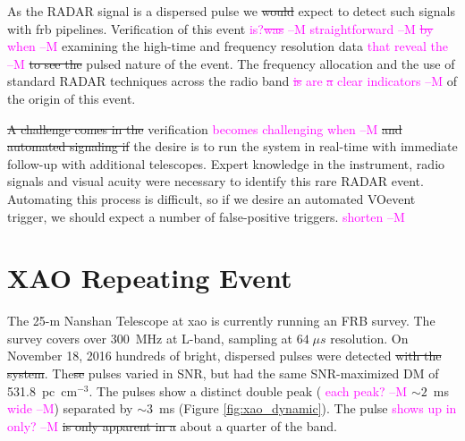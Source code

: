 \documentclass[a4paper,fleqn,usenatbib]{mnras}
\newcommand{\cM}[1]{\textcolor{magenta}{ #1 --M}}
\begin{document}
As the RADAR signal is a dispersed pulse we \sout{would} expect to detect such signals
with \gls{frb} pipelines.  Verification of this event \cM{is?\sout{was}} \cM{straightforward} \cM{\sout{by} when}
examining the high-time and frequency resolution data \cM{that reveal the} \sout{to see the} pulsed nature
of the event.  The frequency allocation and the use of standard RADAR techniques
across the radio band \cM{\sout{is} are \sout{a} clear indicators} of the origin of this event.  

\sout{A
challenge comes in the} verification \cM{becomes challenging when} \sout{and automated signaling if} the desire is to
run the system in real-time with immediate follow-up with additional telescopes.
Expert knowledge in the instrument, radio signals and visual acuity were
necessary to identify this rare RADAR event.  Automating this process is
difficult, so if we desire an automated VOevent trigger, we should expect a
number of false-positive triggers. \cM{shorten}

\section{XAO Repeating Event}
\label{sec:xao_event}

The 25-m Nanshan Telescope at \gls{xao} is currently running an FRB survey. The
survey covers over 300~MHz at L-band, sampling at $64 \; \mu s$ resolution. On
November 18, 2016 hundreds of bright, dispersed pulses were detected \sout{with the
system}. The\sout{se} pulses varied in SNR, but had the same SNR-maximized DM of
531.8~pc~cm$^{-3}$. The pulses show a distinct double peak (\cM{each peak?} $\sim 2$~ms \cM{wide})
separated by $\sim 3$~ms (Figure \ref{fig:xao_dynamic}). The pulse \cM{shows up in only?} \sout{is only
apparent in a} about a quarter of the band.
\end{document}
